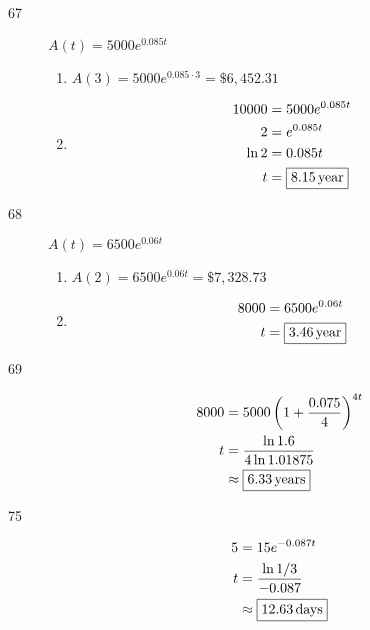 \documentclass{exam}
\begin{document}
\begin{description}
      \item[67]
        $A(t) = 5000 e^{0.085 t}$

        \begin{enumerate}[a]
          \item $A(3) = 5000 e^{0.085 \cdot 3} = \boxed{\$6,452.31}$

          \item
            \begin{align*}
              10000 &= 5000 e^{0.085 t} \\
              2     &= e^{0.085 t} \\
              \ln 2 &= 0.085t \\
              t     &= \boxed{\unit[8.15]{year}} \\
            \end{align*}
        \end{enumerate}

      \item[68]
        $A(t) = 6500 e^{0.06 t}$

        \begin{enumerate}[a]
          \item $A(2) = 6500 e^{0.06 t} = \boxed{\$7,328.73}$

          \item
            \begin{align*}
              8000 &= 6500 e^{0.06 t} \\
              t     &= \boxed{\unit[3.46]{year}} \\
            \end{align*}
        \end{enumerate}

      \item[69]
        \begin{align*}
          8000    &= 5000 \left( 1 + \frac{0.075}{4} \right)^{4t} \\
          t       &= \frac{\ln 1.6}{4 \ln 1.01875} \\
                  &\approx \boxed{\unit[6.33]{years}} \\
        \end{align*}

      \item[75]
        \begin{align*}
          5 &= 15 e^{-0.087t} \\
          t &= \frac{\ln 1/3}{-0.087} \\
            &\approx \boxed{\unit[12.63]{days}} \\
        \end{align*}


\end{description}
\end{document}

